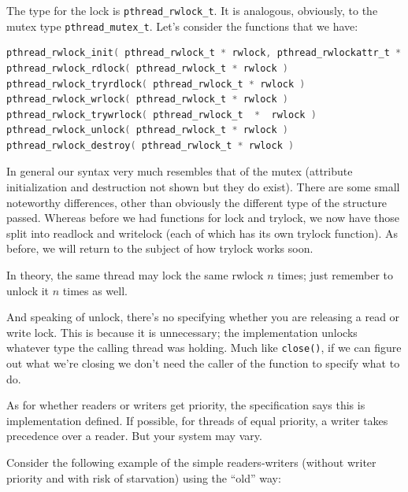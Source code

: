 \documentclass[a4paper]{report}
\begin{document}
The type for the lock is \texttt{pthread\_rwlock\_t}. It is analogous, obviously, to the mutex type \texttt{pthread\_mutex\_t}. Let's consider the functions that we have:

\begin{lstlisting}[language=C]
pthread_rwlock_init( pthread_rwlock_t * rwlock, pthread_rwlockattr_t * attr )
pthread_rwlock_rdlock( pthread_rwlock_t * rwlock )
pthread_rwlock_tryrdlock( pthread_rwlock_t * rwlock )
pthread_rwlock_wrlock( pthread_rwlock_t * rwlock )
pthread_rwlock_trywrlock( pthread_rwlock_t  *  rwlock )
pthread_rwlock_unlock( pthread_rwlock_t * rwlock )
pthread_rwlock_destroy( pthread_rwlock_t * rwlock )
\end{lstlisting}

In general our syntax very much resembles that of the mutex (attribute initialization and destruction not shown but they do exist). There are some small noteworthy differences, other than obviously the different type of the structure passed. Whereas before we had functions for lock and trylock, we now have those split into readlock and writelock (each of which has its own trylock function). As before, we will return to the subject of how trylock works soon.

In theory, the same thread may lock the same rwlock $n$ times; just remember to unlock it $n$ times as well.

And speaking of unlock, there's no specifying whether you are releasing a read or write lock. This is because it is unnecessary; the implementation unlocks whatever type the calling thread was holding. Much like \texttt{close()}, if we can figure out what we're closing we don't need the caller of the function to specify what to do.

As for whether readers or writers get priority, the specification says this is implementation defined. If possible, for threads of equal priority, a writer takes precedence over a reader. But your system may vary.

Consider the following example of the simple readers-writers (without writer priority and with risk of starvation) using the ``old'' way:
\end{document}
